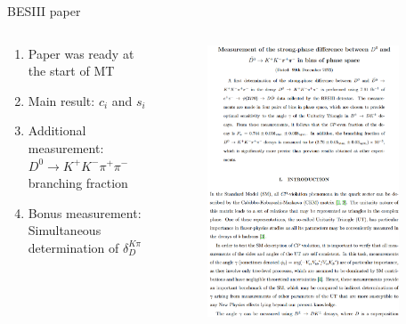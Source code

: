 \documentclass{beamer}
\begin{document}
\begin{frame}{BESIII paper}
  \vspace{-0.5cm}
  \begin{columns}
    \begin{column}{0.6\textwidth}
      \begin{enumerate}
        \setlength\itemsep{1.5em}
        \item{Paper was ready at the start of MT}
        \item{Main result: $c_i$ and $s_i$}
        \item{Additional measurement: $D^0\to K^+K^-\pi^+\pi^-$ branching fraction}
        \item{Bonus measurement: Simultaneous determination of $\delta_D^{K\pi}$}
      \end{enumerate}
    \end{column}
    \begin{column}{0.4\textwidth}
      \begin{figure}
        \includegraphics[width=0.9\textwidth]{Plots/BESIII_paper_1st_page.png}
      \end{figure}
    \end{column}
  \end{columns}
\end{frame}
\end{document}

